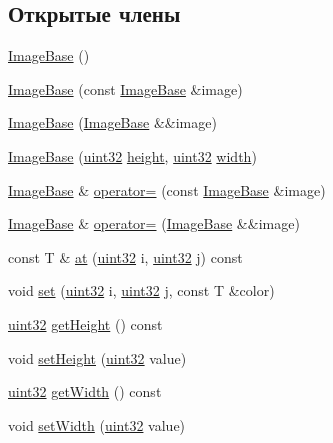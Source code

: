 \subsection*{Открытые члены}
\begin{DoxyCompactItemize}
\item 
\hyperlink{class_image_base_a0d0996266703e4c7bbedf96bc5c6313c}{Image\+Base} ()
\item 
\hyperlink{class_image_base_a43a4b975fe25dfca53ce3f0155dd5976}{Image\+Base} (const \hyperlink{class_image_base}{Image\+Base} \&image)
\item 
\hyperlink{class_image_base_a655bd5b3b40499448b5b204de54de2b2}{Image\+Base} (\hyperlink{class_image_base}{Image\+Base} \&\&image)
\item 
\hyperlink{class_image_base_a6094d4bcf9e48de9b2d66d4f9bbb9db2}{Image\+Base} (\hyperlink{number_8h_a1134b580f8da4de94ca6b1de4d37975e}{uint32} \hyperlink{class_image_base_a2f5f532885f040113c198c424cc0ec7f}{height}, \hyperlink{number_8h_a1134b580f8da4de94ca6b1de4d37975e}{uint32} \hyperlink{class_image_base_a01be4d15909d029bf4ef23f8ed6f6369}{width})
\item 
\hyperlink{class_image_base}{Image\+Base} \& \hyperlink{class_image_base_a84b330cd4e586ff7bed5beee148c3309}{operator=} (const \hyperlink{class_image_base}{Image\+Base} \&image)
\item 
\hyperlink{class_image_base}{Image\+Base} \& \hyperlink{class_image_base_a0def07d97e63c1448751a70e06c3e370}{operator=} (\hyperlink{class_image_base}{Image\+Base} \&\&image)
\item 
const T \& \hyperlink{class_image_base_acf5042cc5679250825272cb23a4594a1}{at} (\hyperlink{number_8h_a1134b580f8da4de94ca6b1de4d37975e}{uint32} i, \hyperlink{number_8h_a1134b580f8da4de94ca6b1de4d37975e}{uint32} j) const 
\item 
void \hyperlink{class_image_base_a2ed65bd7506be1b5bf8ff56a5b56d3a2}{set} (\hyperlink{number_8h_a1134b580f8da4de94ca6b1de4d37975e}{uint32} i, \hyperlink{number_8h_a1134b580f8da4de94ca6b1de4d37975e}{uint32} j, const T \&color)
\item 
\hyperlink{number_8h_a1134b580f8da4de94ca6b1de4d37975e}{uint32} \hyperlink{class_image_base_a750ec0d8ff1dd10dfa26467c018cc68c}{get\+Height} () const 
\item 
void \hyperlink{class_image_base_ac26af0c1bfd19f915f19d6b6f85c05c5}{set\+Height} (\hyperlink{number_8h_a1134b580f8da4de94ca6b1de4d37975e}{uint32} value)
\item 
\hyperlink{number_8h_a1134b580f8da4de94ca6b1de4d37975e}{uint32} \hyperlink{class_image_base_a576197cd4b79d141bb8bd832511fb26a}{get\+Width} () const 
\item 
void \hyperlink{class_image_base_a1448e596fe52852668baa5caefe23f86}{set\+Width} (\hyperlink{number_8h_a1134b580f8da4de94ca6b1de4d37975e}{uint32} value)
\end{DoxyCompactItemize}
